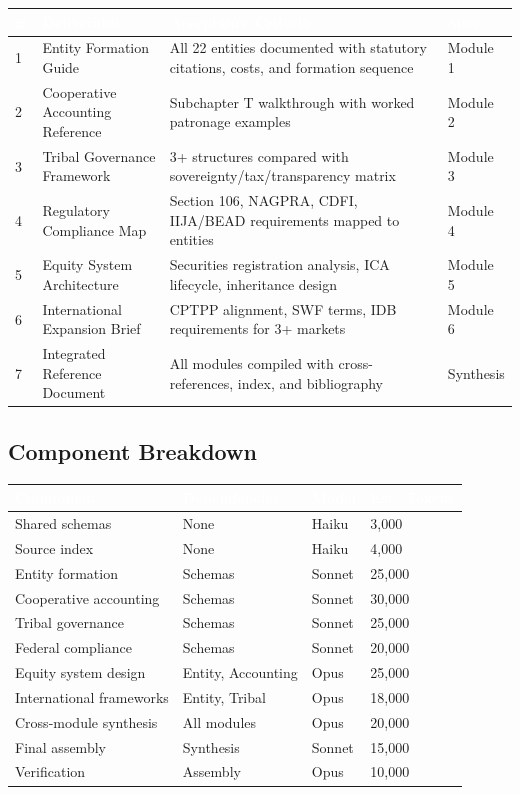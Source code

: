 \documentclass[11pt,letterpaper]{article}
\newcommand{\tableheader}[1]{\textbf{\sffamily\textcolor{white}{#1}}}
\begin{document}
\begin{center}
\begin{tabularx}{\textwidth}{C{0.6cm}L{3.5cm}XL{2.5cm}}
\toprule
{}
\tableheader{\#} & \tableheader{Deliverable} & \tableheader{Acceptance Criteria} & \tableheader{Spec} \\
 & Entity Formation Guide & All 22 entities documented with statutory citations, costs, and formation sequence & Module 1 \\
2 & Cooperative Accounting Reference & Subchapter T walkthrough with worked patronage examples & Module 2 \\
3 & Tribal Governance Framework & 3+ structures compared with sovereignty/tax/transparency matrix & Module 3 \\
4 & Regulatory Compliance Map & Section 106, NAGPRA, CDFI, IIJA/BEAD requirements mapped to entities & Module 4 \\
5 & Equity System Architecture & Securities registration analysis, ICA lifecycle, inheritance design & Module 5 \\
6 & International Expansion Brief & CPTPP alignment, SWF terms, IDB requirements for 3+ markets & Module 6 \\
7 & Integrated Reference Document & All modules compiled with cross-references, index, and bibliography & Synthesis \\
\bottomrule
\end{tabularx}
\end{center}

\subsection{Component Breakdown}

\begin{center}
\begin{tabularx}{\textwidth}{L{3cm}L{2cm}C{1.5cm}C{2cm}}
\toprule
{}
\tableheader{Component} & \tableheader{Dependencies} & \tableheader{Model} & \tableheader{Est.\ Tokens} \\
\midrule
Shared schemas & None & Haiku & 3,000 \\
Source index & None & Haiku & 4,000 \\
Entity formation & Schemas & Sonnet & 25,000 \\
Cooperative accounting & Schemas & Sonnet & 30,000 \\
Tribal governance & Schemas & Sonnet & 25,000 \\
Federal compliance & Schemas & Sonnet & 20,000 \\
Equity system design & Entity, Accounting & Opus & 25,000 \\
International frameworks & Entity, Tribal & Opus & 18,000 \\
Cross-module synthesis & All modules & Opus & 20,000 \\
Final assembly & Synthesis & Sonnet & 15,000 \\
Verification & Assembly & Opus & 10,000 \\
\bottomrule
\end{tabularx}
\end{center}
\end{document}
